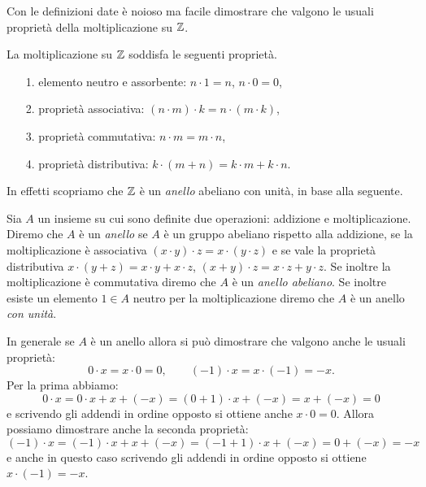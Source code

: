 Con le definizioni date è noioso ma facile dimostrare 
che valgono le usuali proprietà della
moltiplicazione su ${\mathbb Z}$.

\begin{theorem}
  La moltiplicazione su ${\mathbb Z}$ soddisfa le seguenti proprietà.
  \begin{enumerate}
    \item[1.] elemento neutro e assorbente: $n\cdot 1 = n$, $n\cdot 0 = 0$,
    \item[2.] proprietà associativa: $(n\cdot m)\cdot k = n \cdot (m\cdot k)$,
    \item[3.] proprietà commutativa: $n\cdot m = m\cdot n$,
    \item[4.] proprietà distributiva: $k\cdot(m+n) = k\cdot m + k\cdot n$. 
  \end{enumerate}
\end{theorem}

In effetti scopriamo che ${\mathbb Z}$ è un \emph{anello}%
%
 abeliano con unità, in base alla seguente.
%
\begin{definition}[anello]
  \label{def:anello}%
  Sia $A$ un insieme su cui sono definite due operazioni: 
  addizione e moltiplicazione.  
  Diremo che $A$ è un \emph{anello} se $A$ è un gruppo abeliano rispetto alla 
  addizione, 
  se la moltiplicazione è associativa $(x\cdot y)\cdot z = x\cdot (y\cdot z)$ 
  e se vale la proprietà distributiva $x\cdot(y+z) = x\cdot y + x\cdot z$,
  $(x+y)\cdot z = x\cdot z + y\cdot z$.
  Se inoltre la moltiplicazione è commutativa diremo che $A$ è un \emph{anello abeliano}.
  Se inoltre esiste un elemento $1\in A$ neutro per la moltiplicazione 
  diremo che $A$ è un anello \emph{con unità}.
\end{definition}

In generale se $A$ è un anello allora si può dimostrare che valgono anche le usuali proprietà:
\[
  0\cdot x = x\cdot 0 = 0, \qquad
  (-1)\cdot x = x \cdot (-1) = -x.
\]
Per la prima abbiamo: 
\[
  0\cdot x = 0\cdot x + x + (-x) = (0+1)\cdot x + (-x) = x + (-x) = 0
\]
e scrivendo gli addendi in ordine opposto si ottiene anche $x\cdot 0 = 0$.
Allora possiamo dimostrare anche la seconda proprietà:
\[
   (-1)\cdot x = (-1)\cdot x + x + (-x) = (-1 + 1)\cdot x + (-x) = 0 + (-x) = -x
\]
e anche in questo caso scrivendo gli addendi in ordine opposto si ottiene $x\cdot(-1)=-x$.

